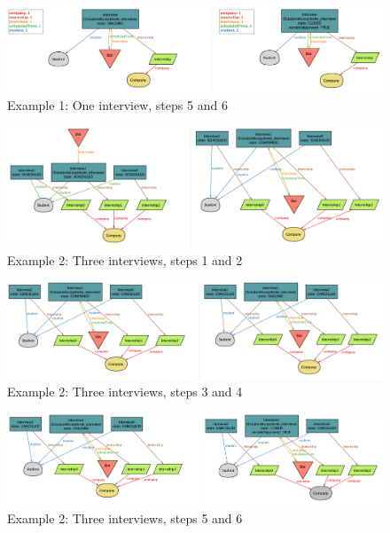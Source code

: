 \begin{figure}[h]
\centering
\includegraphics[width=\textwidth]{Images/caseOneInterview-3.png}
\caption{\label{fig:alloy-example-1-3} Example 1: One interview, steps 5 and 6}
\end{figure}

\begin{figure}[h]
\centering
\includegraphics[width=\textwidth]{Images/caseThreeInterviews-1.png}
\caption{\label{fig:alloy-example-2-1} Example 2: Three interviews, steps 1 and 2}
\end{figure}

\begin{figure}[h]
\centering
\includegraphics[width=\textwidth]{Images/caseThreeInterviews-2.png}
\caption{\label{fig:alloy-example-2-2} Example 2: Three interviews, steps 3 and 4}
\end{figure}

\begin{figure}[h]
\centering
\includegraphics[width=\textwidth]{Images/caseThreeInterviews-3.png}
\caption{\label{fig:alloy-example-2-3} Example 2: Three interviews, steps 5 and 6}
\end{figure}